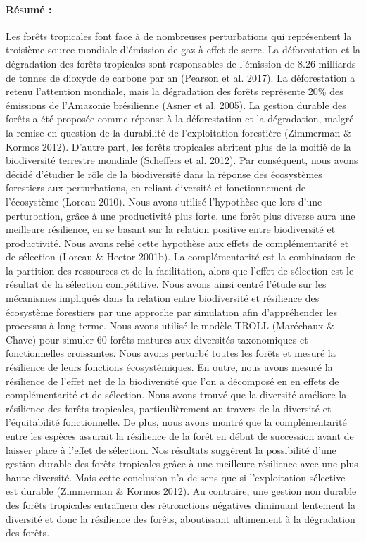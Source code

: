 \newpage
\scriptsize{
\paragraph{Résumé :}
Les forêts tropicales font face à de nombreuses perturbations qui représentent la troisième source mondiale d’émission de gaz à effet de serre. La déforestation et la dégradation des forêts tropicales sont responsables de l’émission de 8.26 milliards de tonnes de dioxyde de carbone par an (Pearson et al. 2017). La déforestation a retenu l’attention mondiale, mais la dégradation des forêts représente 20\% des émissions de l’Amazonie brésilienne (Asner et al. 2005). La gestion durable des forêts a été proposée comme réponse à la déforestation et la dégradation, malgré la remise en question de la durabilité de l’exploitation forestière (Zimmerman \& Kormos 2012). D’autre part, les forêts tropicales abritent plus de la moitié de la biodiversité terrestre mondiale (Scheffers et al. 2012). Par conséquent, nous avons décidé d’étudier le rôle de la biodiversité dans la réponse des écosystèmes forestiers aux perturbations, en reliant diversité et fonctionnement de l’écosystème (Loreau 2010). Nous avons utilisé l’hypothèse que lors d’une perturbation, grâce à une productivité plus forte, une forêt plus diverse aura une meilleure résilience, en se basant sur la relation positive entre biodiversité et productivité. Nous avons relié cette hypothèse aux effets de complémentarité et de sélection (Loreau \& Hector 2001b). La complémentarité est la combinaison de la partition des ressources et de la facilitation, alors que l’effet de sélection est le résultat de la sélection compétitive. Nous avons ainsi centré l’étude sur les mécanismes impliqués dans la relation entre biodiversité et résilience des écosystème forestiers par une approche par simulation afin d’appréhender les processus à long terme. Nous avons utilisé le modèle TROLL (Maréchaux \& Chave) pour simuler 60 forêts matures aux diversités taxonomiques et fonctionnelles croissantes. Nous avons perturbé toutes les forêts et mesuré la résilience de leurs fonctions écosystémiques. En outre, nous avons mesuré la résilience de l’effet net de la biodiversité que l’on a décomposé en en effets de complémentarité et de sélection. Nous avons trouvé que la diversité améliore la résilience des forêts tropicales, particulièrement au travers de la diversité et l’équitabilité fonctionnelle. De plus, nous avons montré que la complémentarité entre les espèces assurait la résilience de la forêt en début de succession avant de laisser place à l’effet de sélection. Nos résultats suggèrent la possibilité d’une gestion durable des forêts tropicales grâce à une meilleure résilience avec une plus haute diversité. Mais cette conclusion n’a de sens que si l’exploitation sélective est durable (Zimmerman \& Kormos 2012). Au contraire, une gestion non durable des forêts tropicales entraînera des rétroactions négatives diminuant lentement la diversité et donc la résilience des forêts, aboutissant ultimement à la dégradation des forêts.
}
